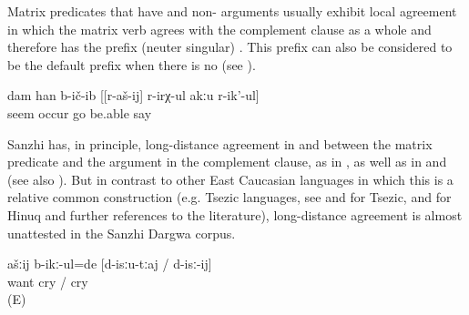 Matrix predicates that have  and non- arguments usually exhibit local agreement in which the matrix verb agrees with the complement clause as a whole and therefore has the prefix  (neuter singular) . This prefix can also be considered to be the default prefix when there is no  (see ).
%
\begin{exe}
	\ex	\label{ex:‎I thought that she cannot walk}
	\gll	dam	han	b-ič-ib	[[r-aš-ij]	r-irχ-ul	akːu	r-ik'-ul]\\
			seem	occur	\tsc{f-}go be.able		say\\
	\glt	{}
\end{exe}

Sanzhi has, in principle, long-distance agreement in  and  between the matrix predicate and the  argument in the complement clause, as in , as well as in  and  (see also ). But in contrast to other East Caucasian languages in which this is a relative common construction (e.g. Tsezic languages, see \citealp{Polinsky.Potsdam2001} and \citealp{Polinsky2003} for Tsezic, and \citealp[628]{Forker2013a} for Hinuq and further references to the literature), long-distance agreement is almost unattested in the Sanzhi Dargwa corpus. 
%
\begin{exe}
	\ex	\label{ex:You wanted to cry1}
	\gll	ašːij	b-ikː-ul=de	[d-isːu-tːaj	/	d-isː-ij]\\
			want	cry	/	cry\\
	\glt	{} (E)
\end{exe}

